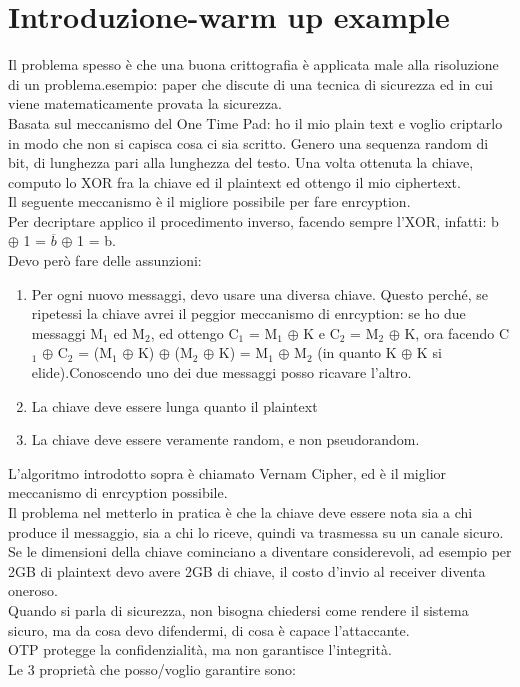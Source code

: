 \documentclass[16px]{article}
\begin{document}
\tableofcontents
\section{Introduzione-warm up example}
Il problema spesso è che una buona crittografia è applicata male alla risoluzione di un problema.esempio: paper che discute di una tecnica di sicurezza ed in cui viene matematicamente provata la sicurezza.\\ Basata sul meccanismo del One Time Pad: ho il mio plain text e voglio criptarlo in modo che non si capisca cosa ci sia scritto. Genero una sequenza random di bit, di lunghezza pari alla lunghezza del testo. Una volta ottenuta la chiave, computo lo XOR fra la chiave ed il plaintext ed ottengo il mio ciphertext.\\ Il seguente meccanismo è il migliore possibile per fare enrcyption.\\ Per decriptare applico il procedimento inverso, facendo sempre l'XOR, infatti: b $\oplus$ 1 = $\overline{b}$ $\oplus$ 1 = b.\\ Devo però fare delle assunzioni:
\begin{enumerate}
\item Per ogni nuovo messaggi, devo usare una diversa chiave. Questo perché, se ripetessi la chiave avrei il peggior meccanismo di enrcyption: se ho due messaggi M$_{1}$ ed M$_{2}$, ed ottengo C$_{1}$ = M$_{1}$ $\oplus$ K e C$_{2}$ = M$_{2}$ $\oplus$ K, ora facendo C$_{1}$ $\oplus$ C$_{2}$ = (M$_{1}$ $\oplus$ K) $\oplus$ (M$_{2}$ $\oplus$ K) = M$_{1}$ $\oplus$ M$_{2}$ (in quanto K $\oplus$ K si elide).Conoscendo uno dei due messaggi posso ricavare l'altro.
\item La chiave deve essere lunga quanto il plaintext
\item La chiave deve essere veramente random, e non pseudorandom.
\end{enumerate}
L'algoritmo introdotto sopra è chiamato Vernam Cipher, ed è il miglior meccanismo di enrcyption possibile.\\ Il problema nel metterlo in pratica è che la chiave deve essere nota sia a chi produce il messaggio, sia a chi lo riceve, quindi va trasmessa su un canale sicuro. Se le dimensioni della chiave cominciano a diventare considerevoli, ad esempio per 2GB di plaintext devo avere 2GB di chiave, il costo d'invio al receiver diventa oneroso.\\ Quando si parla di sicurezza, non bisogna chiedersi come rendere il sistema sicuro, ma da cosa devo difendermi, di cosa è capace l'attaccante.\\ OTP protegge la confidenzialità, ma non garantisce l'integrità.\\ Le 3 proprietà che posso/voglio garantire sono:
\end{document}
